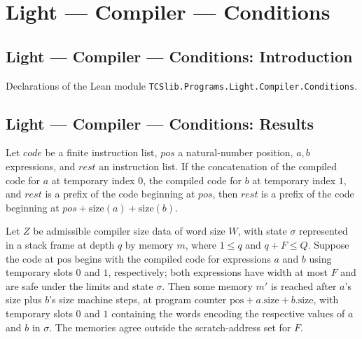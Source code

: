 \section{Light --- Compiler --- Conditions}
\subsection*{Light --- Compiler --- Conditions: Introduction}

Declarations of the Lean module \texttt{TCSlib.Programs.Light.Compiler.Conditions}.

\subsection*{Light --- Compiler --- Conditions: Results}

\begin{theorem}
\label{Light.Compiler.codeAt_after_pair}
\leanok
{}
Let $code$ be a finite instruction list, $pos$ a natural-number position, $a,b$
expressions, and $rest$ an instruction list. If the concatenation of the compiled code
for $a$ at temporary index $0$, the compiled code for $b$ at temporary index $1$, and
$rest$ is a prefix of the code beginning at $pos$, then $rest$ is a prefix of the code
beginning at $pos+\mathrm{size}(a)+\mathrm{size}(b)$.
\end{theorem}

\begin{theorem}
\label{Light.Compiler.steps_pair}
\leanok
{}
Let $Z$ be admissible compiler size data of word size $W$, with state $\sigma$
represented in a stack frame at depth $q$ by memory $m$, where $1\le q$ and $q+F\le Q$.
Suppose the code at $\mathrm{pos}$ begins with the compiled code for expressions $a$ and
$b$ using temporary slots $0$ and $1$, respectively; both expressions have width at most
$F$ and are safe under the limits and state $\sigma$. Then some memory $m'$ is reached
after $a$'s size plus $b$'s size machine steps, at program counter
$\mathrm{pos}+a.\mathrm{size}+b.\mathrm{size}$, with temporary slots $0$ and $1$
containing the words encoding the respective values of $a$ and $b$ in $\sigma$. The
memories agree outside the scratch-address set for $F$.
\end{theorem}


